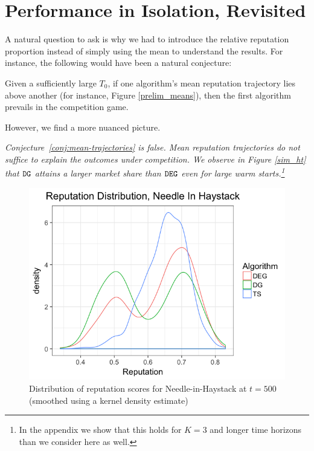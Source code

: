 \documentclass[../competing_bandits.tex]{subfiles}
\begin{document}
\section{Performance in Isolation, Revisited}\label{section:revisited}

A natural question to ask is why we had to introduce the relative reputation proportion instead of simply using the mean to understand the results. For instance, the following would have been a natural conjecture:
\begin{conjecture}\label{conj:mean-trajectories}
Given a sufficiently large $T_0$, if one algorithm's mean reputation trajectory lies above another (for instance, Figure  \ref{prelim_means}), then the first algorithm prevails in the competition game.
\end{conjecture}

However, we find a more nuanced picture.

\begin{finding}
\textit{
Conjecture~\ref{conj:mean-trajectories} is false. Mean reputation trajectories do not suffice to explain the outcomes under competition. We observe in Figure \ref{sim_ht} that $\mathtt{DG}$ attains a larger market share than $\mathtt{DEG}$ even for large warm starts.\footnote{In the appendix we show that this holds for $K = 3$ and longer time horizons than we consider here as well.}}
\end{finding}

\begin{figure}[ht]
\includegraphics[scale=0.35]{figures/rep_distribution_nih}
\caption{Distribution of reputation scores for Needle-in-Haystack at $t=500$ (smoothed using a kernel density estimate)}
\label{rep_dist_nih}
\end{figure}
\end{document}
